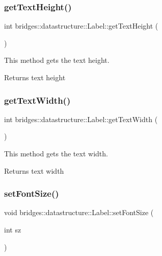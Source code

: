 \subsubsection{\texorpdfstring{get\+Text\+Height()}{getTextHeight()}}
{\footnotesize\ttfamily int bridges\+::datastructure\+::\+Label\+::get\+Text\+Height (\begin{DoxyParamCaption}{ }\end{DoxyParamCaption})\hspace{0.3cm}{\ttfamily [inline]}}



This method gets the text height. 

\begin{DoxyReturn}{Returns}
text height 
\end{DoxyReturn}
\mbox{\label{classbridges_1_1datastructure_1_1_label_ab97fecf82c0c21f870f4dc25b6244099}} 
\subsubsection{\texorpdfstring{get\+Text\+Width()}{getTextWidth()}}
{\footnotesize\ttfamily int bridges\+::datastructure\+::\+Label\+::get\+Text\+Width (\begin{DoxyParamCaption}{ }\end{DoxyParamCaption})\hspace{0.3cm}{\ttfamily [inline]}}



This method gets the text width. 

\begin{DoxyReturn}{Returns}
text width 
\end{DoxyReturn}
\mbox{\label{classbridges_1_1datastructure_1_1_label_aee5cc86a51a237c87e56db8e02d271b1}} 
\subsubsection{\texorpdfstring{set\+Font\+Size()}{setFontSize()}}
{\footnotesize\ttfamily void bridges\+::datastructure\+::\+Label\+::set\+Font\+Size (\begin{DoxyParamCaption}\item[{int}]{sz }\end{DoxyParamCaption})\hspace{0.3cm}{\ttfamily [inline]}}



